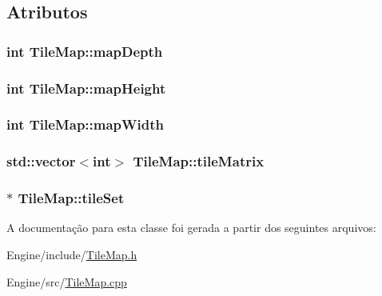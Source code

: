 \subsection{Atributos}
\hypertarget{classTileMap_a9f9975834cc5f1acad95d72828858862}{
\subsubsection[{map\+Depth}]{\setlength{\rightskip}{0pt plus 5cm}int Tile\+Map\+::map\+Depth\hspace{0.3cm}{\ttfamily [private]}}}\label{classTileMap_a9f9975834cc5f1acad95d72828858862}
\hypertarget{classTileMap_a8fec89ca278b51de7f3e38831d9fb161}{
\subsubsection[{map\+Height}]{\setlength{\rightskip}{0pt plus 5cm}int Tile\+Map\+::map\+Height\hspace{0.3cm}{\ttfamily [private]}}}\label{classTileMap_a8fec89ca278b51de7f3e38831d9fb161}
\hypertarget{classTileMap_ae2361e840eacaebbbbc91541ded00655}{
\subsubsection[{map\+Width}]{\setlength{\rightskip}{0pt plus 5cm}int Tile\+Map\+::map\+Width\hspace{0.3cm}{\ttfamily [private]}}}\label{classTileMap_ae2361e840eacaebbbbc91541ded00655}
\hypertarget{classTileMap_ac1d3ce0587c4e615682b71fd96295e0e}{
\subsubsection[{tile\+Matrix}]{\setlength{\rightskip}{0pt plus 5cm}std\+::vector$<$int$>$ Tile\+Map\+::tile\+Matrix\hspace{0.3cm}{\ttfamily [private]}}}\label{classTileMap_ac1d3ce0587c4e615682b71fd96295e0e}
\hypertarget{classTileMap_a24b2ea7aecfd795f1e13dfa9b0b3cb76}{
\subsubsection[{tile\+Set}]{$\ast$ Tile\+Map\+::tile\+Set\hspace{0.3cm}{\ttfamily [private]}}}\label{classTileMap_a24b2ea7aecfd795f1e13dfa9b0b3cb76}


A documentação para esta classe foi gerada a partir dos seguintes arquivos\+:\begin{DoxyCompactItemize}
\item 
Engine/include/\hyperlink{TileMap_8h}{Tile\+Map.\+h}\item 
Engine/src/\hyperlink{TileMap_8cpp}{Tile\+Map.\+cpp}\end{DoxyCompactItemize}
